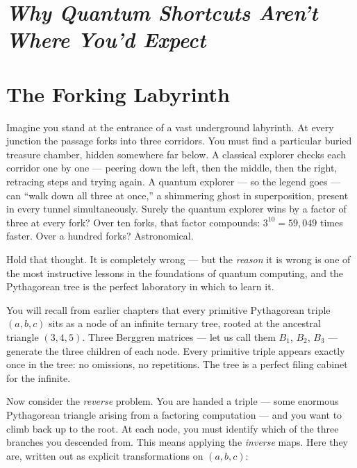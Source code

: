 \section{\texorpdfstring{\emph{Why Quantum Shortcuts Aren't Where You'd Expect}}{Why Quantum Shortcuts Aren't Where You'd Expect}}\label{ch7-why-quantum-shortcuts-arent-where-youd-expect}



\section{The Forking Labyrinth}\label{ch7-the-forking-labyrinth}

Imagine you stand at the entrance of a vast underground labyrinth. At every junction the passage forks into three corridors. You must find a particular buried treasure chamber, hidden somewhere far below. A classical explorer checks each corridor one by one --- peering down the left, then the middle, then the right, retracing steps and trying again. A quantum explorer --- so the legend goes --- can ``walk down all three at once,'' a shimmering ghost in superposition, present in every tunnel simultaneously. Surely the quantum explorer wins by a factor of three at every fork? Over ten forks, that factor compounds: \(3^{10} = 59{,}049\) times faster. Over a hundred forks? Astronomical.

Hold that thought. It is completely wrong --- but the \emph{reason} it is wrong is one of the most instructive lessons in the foundations of quantum computing, and the Pythagorean tree is the perfect laboratory in which to learn it.

You will recall from earlier chapters that every primitive Pythagorean triple \((a, b, c)\) sits as a node of an infinite ternary tree, rooted at the ancestral triangle \((3, 4, 5)\). Three Berggren matrices --- let us call them \(B_1\), \(B_2\), \(B_3\) --- generate the three children of each node. Every primitive triple appears exactly once in the tree: no omissions, no repetitions. The tree is a perfect filing cabinet for the infinite.

Now consider the \emph{reverse} problem. You are handed a triple --- some enormous Pythagorean triangle arising from a factoring computation --- and you want to climb back up to the root. At each node, you must identify which of the three branches you descended from. This means applying the \emph{inverse} maps. Here they are, written out as explicit transformations on \((a, b, c)\):

